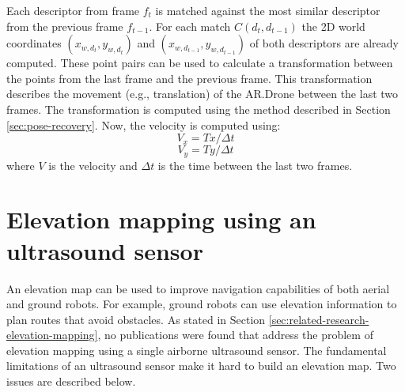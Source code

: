 Each descriptor from frame $f_t$ is matched against the most similar descriptor from the previous frame $f_{t-1}$.
For each match $C(d_t, d_{t-1})$ the 2D world coordinates $(x_{w, d_t}, y_{w, d_t})$ and $(x_{w, d_{t-1}}, y_{w, d_{t-1}})$ of both descriptors are already computed.
These point pairs can be used to calculate a transformation between the points from the last frame and the previous frame.
This transformation describes the movement (e.g., translation) of the AR.Drone between the last two frames.
The transformation is computed using the method described in Section \ref{sec:pose-recovery}.
Now, the velocity is computed using:
\begin{equation}
V_x = Tx / \Delta t
\end{equation}
\begin{equation}
V_y = Ty / \Delta t
\end{equation}
where $V$ is the velocity and $\Delta t$ is the time between the last two frames.



	\section{Elevation mapping using an ultrasound sensor}
	\label{sec:elevation_map}
An elevation map can be used to improve navigation capabilities of both aerial and ground robots.
For example, ground robots can use elevation information to plan routes that avoid obstacles.
As stated in Section \ref{sec:related-research-elevation-mapping}, no publications were found that address the problem of elevation mapping using a single airborne ultrasound sensor.
The fundamental limitations of an ultrasound sensor make it hard to build an elevation map.
Two issues are described below.

